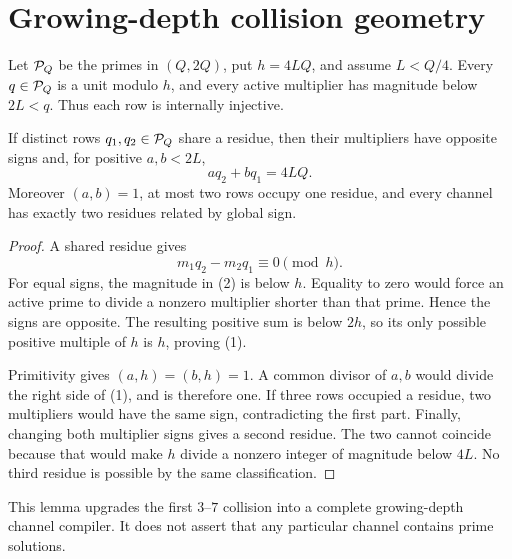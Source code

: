 \section{Growing-depth collision geometry}

Let \(\mathcal P_Q\) be the primes in \((Q,2Q)\), put \(h=4LQ\), and assume
\(L<Q/4\).  Every \(q\in\mathcal P_Q\) is a unit modulo \(h\), and every active
multiplier has magnitude below \(2L<q\).  Thus each row is internally
injective.

\begin{lemma}
If distinct rows \(q_1,q_2\in\mathcal P_Q\) share a residue, then their multipliers
have opposite signs and, for positive \(a,b<2L\),
\[
 a q_2+b q_1=4LQ. \tag{1}
\]
Moreover \((a,b)=1\), at most two rows occupy one residue, and every channel
has exactly two residues related by global sign.
\end{lemma}

\begin{proof}
A shared residue gives
\[
 m_1q_2-m_2q_1\equiv0\pmod h. \tag{2}
\]
For equal signs, the magnitude in (2) is below \(h\).  Equality to zero would
force an active prime to divide a nonzero multiplier shorter than that prime.
Hence the signs are opposite.  The resulting positive sum is below \(2h\),
so its only possible positive multiple of \(h\) is \(h\), proving (1).

Primitivity gives \((a,h)=(b,h)=1\).  A common divisor of \(a,b\) would divide
the right side of (1), and is therefore one.  If three rows occupied a
residue, two multipliers would have the same sign, contradicting the first
part.  Finally, changing both multiplier signs gives a second residue.  The
two cannot coincide because that would make \(h\) divide a nonzero integer
of magnitude below \(4L\).  No third residue is possible by the same
classification.
\end{proof}

This lemma upgrades the first \(3\)--\(7\) collision into a complete
growing-depth channel compiler.  It does not assert that any particular
channel contains prime solutions.
